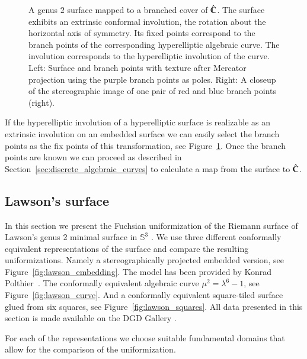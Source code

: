 \documentclass[Thesis]{subfiles}
\begin{document}
\begin{figure} 
\centering
{}
\caption{
A genus $2$ surface mapped to a branched cover of $\hat{\mathbb C}$. 
The surface exhibits an extrinsic conformal involution, the rotation about the horizontal axis of symmetry. 
Its fixed points correspond to the branch points of the corresponding hyperelliptic algebraic curve.
The involution corresponds to the hyperelliptic involution of the curve.  
Left: Surface and branch points with texture after Mercator projection using the purple
branch points as poles. 
Right: A closeup of the stereographic image of one pair of red and blue branch points (right).
} 
\label{fig:genus2_branched} 
\end{figure}

If the hyperelliptic involution of a hyperelliptic surface is realizable as an extrinsic involution on an embedded surface we can easily select the branch points as the fix points of this transformation, see Figure~\ref{fig:genus2_branched}. 
Once the branch points are known we can proceed as described in Section~\ref{sec:discrete_algebraic_curves} to calculate a map from the surface to $\hat{\mathbb C}$.

\subsection{Lawson's surface}

In this section we present the Fuchsian uniformization of the Riemann surface of Lawson's genus 2 minimal surface in $\mathbb{S}^3$ \cite{Law1970}.
We use three different conformally equivalent representations of the surface and compare the resulting uniformizations.
Namely a stereographically projected embedded version, see Figure~\ref{fig:lawson_embedding}.
The model has been provided by Konrad Polthier~\cite{polthier97}.
The conformally equivalent algebraic curve $\mu^2=\lambda^6-1$, see Figure~\ref{fig:lawson_curve}.
And a conformally equivalent square-tiled surface glued from six squares, see Figure~\ref{fig:lawson_squares}.
All data presented in this section is made available on the {\sc DGD Gallery} \cite{gallery-lawson-webpage}.

For each of the representations we choose suitable fundamental domains that allow for the comparison of the uniformization.
\end{document}
